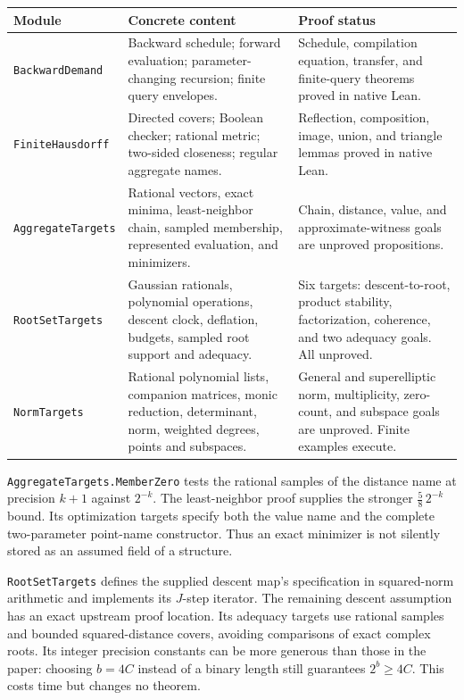 \begin{longtable}{@{}p{}p{}p{}@{}}
\toprule
Module & Concrete content & Proof status\\
\midrule
\endhead
\texttt{BackwardDemand} & Backward schedule; forward evaluation;
parameter-changing recursion; finite query envelopes. & Schedule,
compilation equation, transfer, and finite-query theorems proved in
native Lean.\\[4pt]
\texttt{FiniteHausdorff} & Directed covers; Boolean checker; rational
metric; two-sided closeness; regular aggregate names. & Reflection,
composition, image, union, and triangle lemmas proved in native Lean.\\[4pt]
\texttt{AggregateTargets} & Rational vectors, exact minima, least-neighbor
chain, sampled membership, represented evaluation, and minimizers. &
Chain, distance, value, and approximate-witness goals are unproved
propositions.\\[4pt]
\texttt{RootSetTargets} & Gaussian rationals, polynomial operations,
descent clock, deflation, budgets, sampled root support and adequacy. &
Six targets: descent-to-root, product stability, factorization,
coherence, and two adequacy goals. All unproved.\\[4pt]
\texttt{NormTargets} & Rational polynomial lists, companion matrices, monic
reduction, determinant, norm, weighted degrees, points and subspaces. &
General and superelliptic norm, multiplicity, zero-count, and subspace
goals are unproved. Finite examples execute.\\
\bottomrule
\end{longtable}

\texttt{AggregateTargets.MemberZero} tests the rational samples of the
distance name at precision $k+1$ against $2^{-k}$. The least-neighbor
proof supplies the stronger $\tfrac58\,2^{-k}$ bound. Its optimization
targets specify both the value name and the complete two-parameter
point-name constructor. Thus an exact minimizer is not silently stored
as an assumed field of a structure.

\texttt{RootSetTargets} defines the supplied descent map's specification
in squared-norm arithmetic and implements its $J$-step iterator. The
remaining descent assumption has an exact upstream proof location.
Its adequacy targets use rational samples and bounded squared-distance
covers, avoiding comparisons of exact complex roots. Its integer
precision constants can be more generous than those in the paper:
choosing $b=4C$ instead of a binary length still guarantees $2^b\ge4C$.
This costs time but changes no theorem.

